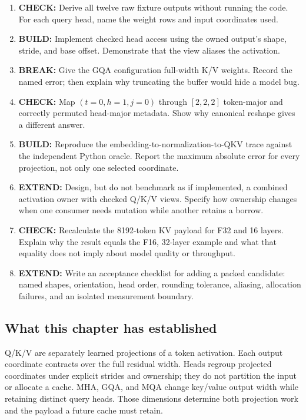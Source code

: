 \documentclass[
  10pt,
]{article}
\providecommand{\tightlist}{%
  \setlength{\itemsep}{0pt}\setlength{\parskip}{0pt}}
\begin{document}
\begin{enumerate}
\def\labelenumi{\arabic{enumi}.}
\tightlist
\item
  \textbf{CHECK:} Derive all twelve raw fixture outputs without running
  the code. For each query head, name the weight rows and input
  coordinates used.
\item
  \textbf{BUILD:} Implement checked head access using the owned output's
  shape, stride, and base offset. Demonstrate that the view aliases the
  activation.
\item
  \textbf{BREAK:} Give the GQA configuration full-width K/V weights.
  Record the named error; then explain why truncating the buffer would
  hide a model bug.
\item
  \textbf{CHECK:} Map \((t=0,h=1,j=0)\) through \([2,2,2]\) token-major
  and correctly permuted head-major metadata. Show why canonical reshape
  gives a different answer.
\item
  \textbf{BUILD:} Reproduce the embedding-to-normalization-to-QKV trace
  against the independent Python oracle. Report the maximum absolute
  error for every projection, not only one selected coordinate.
\item
  \textbf{EXTEND:} Design, but do not benchmark as if implemented, a
  combined activation owner with checked Q/K/V views. Specify how
  ownership changes when one consumer needs mutation while another
  retains a borrow.
\item
  \textbf{CHECK:} Recalculate the 8192-token KV payload for F32 and 16
  layers. Explain why the result equals the F16, 32-layer example and
  what that equality does not imply about model quality or throughput.
\item
  \textbf{EXTEND:} Write an acceptance checklist for adding a packed
  candidate: named shapes, orientation, head order, rounding tolerance,
  aliasing, allocation failures, and an isolated measurement boundary.
\end{enumerate}

\subsection{What this chapter has
established}\label{what-this-chapter-has-established}

Q/K/V are separately learned projections of a token activation. Each
output coordinate contracts over the full residual width. Heads regroup
projected coordinates under explicit strides and ownership; they do not
partition the input or allocate a cache. MHA, GQA, and MQA change
key/value output width while retaining distinct query heads. Those
dimensions determine both projection work and the payload a future cache
must retain.
\end{document}
